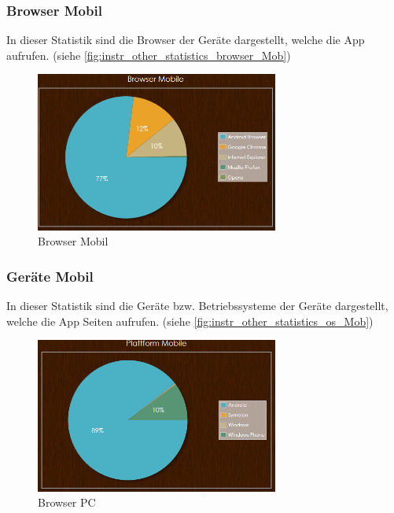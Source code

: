 \subsubsection{Browser Mobil}
In dieser Statistik sind die Browser der Geräte dargestellt, welche die App aufrufen. (siehe \autoref{fig:instr_other_statistics_browser_Mob})
\begin{figure}[H]
\centering
\includegraphics[keepaspectratio=true, width=8cm]{images/screenshots/statistics_browser_Mob.png}
\caption{Browser Mobil}
\label{fig:instr_other_statistics_browser_Mob}
\end{figure}
\subsubsection{Geräte Mobil}
In dieser Statistik sind die Geräte bzw. Betriebssysteme der Geräte dargestellt, welche die App Seiten aufrufen. (siehe \autoref{fig:instr_other_statistics_os_Mob})
\begin{figure}[H]
\centering
\includegraphics[keepaspectratio=true, width=8cm]{images/screenshots/statistics_os_Mob.png}
\caption{Browser PC}
\label{fig:instr_other_statistics_os_Mob}
\end{figure}
